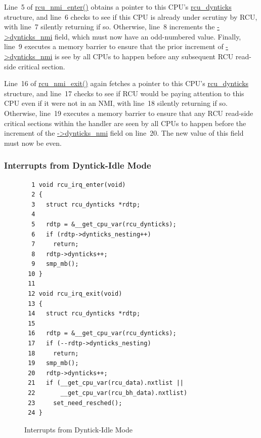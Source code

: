 Line~5 of \url{rcu_nmi_enter()} obtains a pointer to this CPU's
\url{rcu_dynticks} structure, and line~6 checks to see if this
CPU is already under scrutiny by RCU, with line~7 silently returning
if so.
Otherwise, line~8 increments the \url{->dynticks_nmi} field, which
must now have an odd-numbered value.
Finally, line~9 executes a memory barrier to ensure that the prior
increment of \url{->dynticks_nmi} is see by all CPUs to happen
before any subsequent RCU read-side critical section.

Line~16 of \url{rcu_nmi_exit()} again fetches a pointer to this CPU's
\url{rcu_dynticks} structure, and line~17 checks to see if RCU would
be paying attention to this CPU even if it were not in an NMI,
with line~18 silently returning if so.
Otherwise, line~19 executes a memory barrier to ensure that any
RCU read-side critical sections within the handler are seen by all
CPUs to happen before the increment of the \url{->dynticks_nmi} field
on line~20.
The new value of this field must now be even.

 \QuickQuizEnd

\subsubsection{Interrupts from Dyntick-Idle Mode}
\label{app:rcuimpl:rcutreewt:Interrupts from Dyntick-Idle Mode}

\begin{figure}[tbp]
{ \scriptsize
\begin{verbatim}
  1 void rcu_irq_enter(void)
  2 {
  3   struct rcu_dynticks *rdtp;
  4 
  5   rdtp = &__get_cpu_var(rcu_dynticks);
  6   if (rdtp->dynticks_nesting++)
  7     return;
  8   rdtp->dynticks++;
  9   smp_mb();
 10 }
 11 
 12 void rcu_irq_exit(void)
 13 {
 14   struct rcu_dynticks *rdtp;
 15 
 16   rdtp = &__get_cpu_var(rcu_dynticks);
 17   if (--rdtp->dynticks_nesting)
 18     return;
 19   smp_mb();
 20   rdtp->dynticks++;
 21   if (__get_cpu_var(rcu_data).nxtlist ||
 22       __get_cpu_var(rcu_bh_data).nxtlist)
 23     set_need_resched();
 24 }
\end{verbatim}
}
\caption{Interrupts from Dyntick-Idle Mode}
\label{fig:app:rcuimpl:rcutreewt:Interrupts from Dyntick-Idle Mode}
\end{figure}


